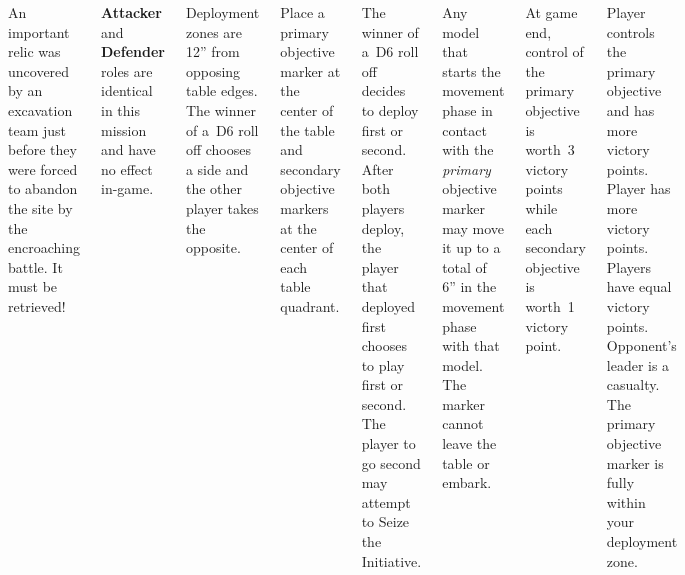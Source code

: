 
\begin{columns}

  An important relic was uncovered by an excavation team just before
  they were forced to abandon the site by the encroaching battle.  It
  must be retrieved!

  \textbf{Attacker} and \textbf{Defender} roles are identical in this
  mission and have no effect in-game.

%

Deployment zones are 12'' from opposing table edges.  The winner of
a~D6 roll off chooses a side and the other player takes the opposite.

Place a primary objective marker at the center of the table and
secondary objective markers at the center of each table quadrant.


%

The winner of a~D6 roll off decides to deploy first or second.  After
both players deploy, the player that deployed first chooses to play
first or second.  The player to go second may attempt to Seize the
Initiative.

Any model that starts the movement phase in contact with the
\emph{primary} objective marker may move it up to a total of 6'' in
the movement phase with that model.  The marker cannot leave the table
or embark.


At game end, control of the primary objective is worth~3 victory
points while each secondary objective is worth~1 victory point.

\scoringbox%
{Player controls the primary objective and has more victory points.}%
{Player has more victory points.}%
{Players have equal victory points.}%
{Opponent's leader is a casualty.}%
{The primary objective marker is fully within your deployment zone.}

\end{columns}
